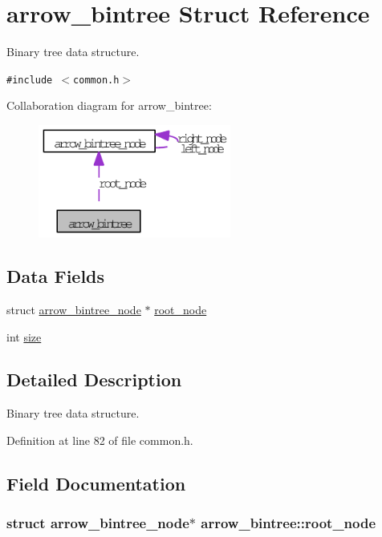 \hypertarget{structarrow__bintree}{
\section{arrow\_\-bintree Struct Reference}
\label{structarrow__bintree}
}
Binary tree data structure.  


{\tt \#include $<$common.h$>$}

Collaboration diagram for arrow\_\-bintree:\nopagebreak
\begin{figure}[H]
\begin{center}
\leavevmode
\includegraphics[width=179pt]{structarrow__bintree__coll__graph}
\end{center}
\end{figure}
\subsection*{Data Fields}
\begin{CompactItemize}
\item 
struct \hyperlink{structarrow__bintree__node}{arrow\_\-bintree\_\-node} $\ast$ \hyperlink{structarrow__bintree_09f6d0bd6e32ae2c2f8df57a31388df6}{root\_\-node}
\item 
int \hyperlink{structarrow__bintree_7570628df0b5317cc8e240499ba12974}{size}
\end{CompactItemize}


\subsection{Detailed Description}
Binary tree data structure. 

Definition at line 82 of file common.h.

\subsection{Field Documentation}
\hypertarget{structarrow__bintree_09f6d0bd6e32ae2c2f8df57a31388df6}{
\subsubsection[{root\_\-node}]{\setlength{\rightskip}{0pt plus 5cm}struct {\bf arrow\_\-bintree\_\-node}$\ast$ {\bf arrow\_\-bintree::root\_\-node}}}
\label{structarrow__bintree_09f6d0bd6e32ae2c2f8df57a31388df6}


